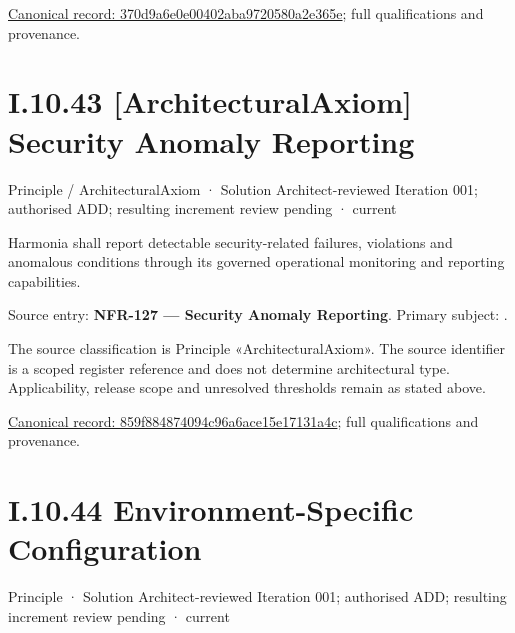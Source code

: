 {\footnotesize \href{../../../../continuum/motivation/principle/architectural-axiom/370d9a6e0e00402aba9720580a2e365e.md}{Canonical record: 370d9a6e0e00402aba9720580a2e365e}; full qualifications and provenance.}\par
\section*{I.10.43 [ArchitecturalAxiom] Security Anomaly Reporting}
\label{navigation:I.10.43}

\label{element:859f884874094c96a6ace15e17131a4c}
{\small Principle / ArchitecturalAxiom · Solution Architect-reviewed Iteration 001; authorised ADD; resulting increment review pending · current}\par

Harmonia shall report detectable security-related failures, violations and anomalous conditions through its governed operational monitoring and reporting capabilities.



Source entry: \textbf{NFR-127 — Security Anomaly Reporting}. Primary subject: \texttt{}.



The source classification is Principle «ArchitecturalAxiom». The source identifier is a scoped register reference and does not determine architectural type. Applicability, release scope and unresolved thresholds remain as stated above.


{\footnotesize \href{../../../../continuum/motivation/principle/architectural-axiom/859f884874094c96a6ace15e17131a4c.md}{Canonical record: 859f884874094c96a6ace15e17131a4c}; full qualifications and provenance.}\par
\section*{I.10.44 Environment-Specific Configuration}
\label{navigation:I.10.44}

\label{element:48e5415eff454e3e9e987506999e62f2}
{\small Principle · Solution Architect-reviewed Iteration 001; authorised ADD; resulting increment review pending · current}\par

